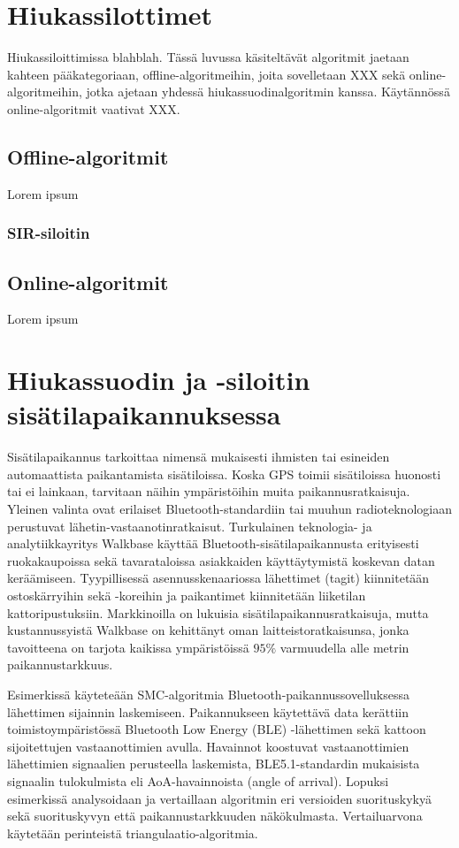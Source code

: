 \documentclass[
  12pt,
  a4paper, twoside]{book}
\begin{document}
\chapter{Hiukassilottimet}

Hiukassiloittimissa blahblah. Tässä luvussa käsiteltävät algoritmit jaetaan kahteen pääkategoriaan, offline-algoritmeihin, joita sovelletaan XXX sekä online-algoritmeihin, jotka ajetaan yhdessä hiukassuodinalgoritmin kanssa. Käytännössä online-algoritmit vaativat XXX.

\section{Offline-algoritmit}

Lorem ipsum

\subsection{SIR-siloitin}

\section{Online-algoritmit}

Lorem ipsum

\chapter{Hiukassuodin ja -siloitin sisätilapaikannuksessa}

Sisätilapaikannus tarkoittaa nimensä mukaisesti ihmisten tai esineiden automaattista paikantamista sisätiloissa. Koska GPS toimii sisätiloissa huonosti tai ei lainkaan, tarvitaan näihin ympäristöihin muita paikannusratkaisuja. Yleinen valinta ovat erilaiset Bluetooth-standardiin tai muuhun radioteknologiaan perustuvat lähetin-vastaanotinratkaisut. Turkulainen teknologia- ja analytiikkayritys Walkbase käyttää Bluetooth-sisätilapaikannusta erityisesti ruokakaupoissa sekä tavarataloissa asiakkaiden käyttäytymistä koskevan datan keräämiseen. Tyypillisessä asennusskenaariossa lähettimet (tagit) kiinnitetään ostoskärryihin sekä -koreihin ja paikantimet kiinnitetään liiketilan kattoripustuksiin. Markkinoilla on lukuisia sisätilapaikannusratkaisuja, mutta kustannussyistä Walkbase on kehittänyt oman laitteistoratkaisunsa, jonka tavoitteena on tarjota kaikissa ympäristöissä \(95\%\) varmuudella alle metrin paikannustarkkuus.

Esimerkissä käyteteään SMC-algoritmia Bluetooth-paikannussovelluksessa lähettimen sijainnin laskemiseen. Paikannukseen käytettävä data kerättiin toimistoympäristössä Bluetooth Low Energy (BLE) -lähettimen sekä kattoon sijoitettujen vastaanottimien avulla. Havainnot koostuvat vastaanottimien lähettimien signaalien perusteella laskemista, BLE5.1-standardin mukaisista signaalin tulokulmista eli AoA-havainnoista (angle of arrival). Lopuksi esimerkissä analysoidaan ja vertaillaan algoritmin eri versioiden suorituskykyä sekä suorituskyvyn että paikannustarkkuuden näkökulmasta. Vertailuarvona käytetään perinteistä triangulaatio-algoritmia.
\end{document}
